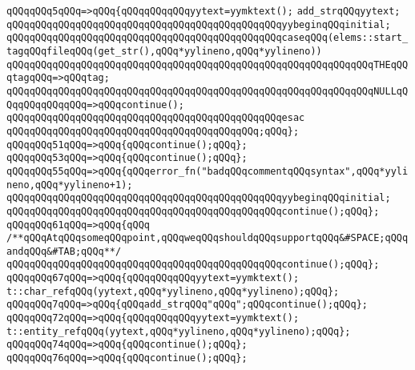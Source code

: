 \verb|qQQqqQQq5qQQq=>qQQq{qQQqqQQqqQQqyytext=yymktext();|\newline
\verb|add_strqQQqyytext;|\newline
\verb|qQQqqQQqqQQqqQQqqQQqqQQqqQQqqQQqqQQqqQQqqQQqqQQqyybeginqQQqinitial;|\newline
\verb|qQQqqQQqqQQqqQQqqQQqqQQqqQQqqQQqqQQqqQQqqQQqqQQqcaseqQQq(elems::start_tagqQQqfileqQQq(get_str(),qQQq*yylineno,qQQq*yylineno))|\newline
\verb|qQQqqQQqqQQqqQQqqQQqqQQqqQQqqQQqqQQqqQQqqQQqqQQqqQQqqQQqqQQqqQQqTHEqQQqtagqQQq=>qQQqtag;|\newline
\verb|qQQqqQQqqQQqqQQqqQQqqQQqqQQqqQQqqQQqqQQqqQQqqQQqqQQqqQQqqQQqqQQqNULLqQQqqQQqqQQqqQQq=>qQQqcontinue();|\newline
\verb|qQQqqQQqqQQqqQQqqQQqqQQqqQQqqQQqqQQqqQQqqQQqqQQqesac|\newline
\verb|qQQqqQQqqQQqqQQqqQQqqQQqqQQqqQQqqQQqqQQqqQQq;qQQq};|\newline
\verb|qQQqqQQq51qQQq=>qQQq{qQQqcontinue();qQQq};|\newline
\verb|qQQqqQQq53qQQq=>qQQq{qQQqcontinue();qQQq};|\newline
\verb|qQQqqQQq55qQQq=>qQQq{qQQqerror_fn("badqQQqcommentqQQqsyntax",qQQq*yylineno,qQQq*yylineno+1);|\newline
\verb|qQQqqQQqqQQqqQQqqQQqqQQqqQQqqQQqqQQqqQQqqQQqqQQqyybeginqQQqinitial;|\newline
\verb|qQQqqQQqqQQqqQQqqQQqqQQqqQQqqQQqqQQqqQQqqQQqqQQqcontinue();qQQq};|\newline
\verb|qQQqqQQq61qQQq=>qQQq{qQQq|\newline
\verb|/**qQQqAtqQQqsomeqQQqpoint,qQQqweqQQqshouldqQQqsupportqQQq&#SPACE;qQQqandqQQq&#TAB;qQQq**/|\newline
\verb|qQQqqQQqqQQqqQQqqQQqqQQqqQQqqQQqqQQqqQQqqQQqqQQqcontinue();qQQq};|\newline
\verb|qQQqqQQq67qQQq=>qQQq{qQQqqQQqqQQqyytext=yymktext();|\newline
\verb|t::char_refqQQq(yytext,qQQq*yylineno,qQQq*yylineno);qQQq};|\newline
\verb|qQQqqQQq7qQQq=>qQQq{qQQqadd_strqQQq"qQQq";qQQqcontinue();qQQq};|\newline
\verb|qQQqqQQq72qQQq=>qQQq{qQQqqQQqqQQqyytext=yymktext();|\newline
\verb|t::entity_refqQQq(yytext,qQQq*yylineno,qQQq*yylineno);qQQq};|\newline
\verb|qQQqqQQq74qQQq=>qQQq{qQQqcontinue();qQQq};|\newline
\verb|qQQqqQQq76qQQq=>qQQq{qQQqcontinue();qQQq};|\newline
